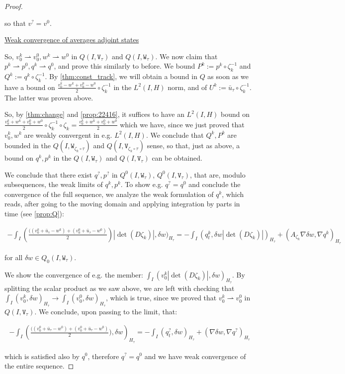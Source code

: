 \documentclass[english,a4paper,9pt,oneside]{scrbook}	%
\theoremstyle{break}
\newenvironment{mproof}[1][\proofname]{%
  \begin{proof}[#1]$ $\par\nobreak\ignorespaces
}{%
  \end{proof}
}
\renewcommand*{\proofname}{Proof}
\theoremstyle{remark}
\newcommand{\ds}{\displaystyle}
\newcommand{\weakc}{\rightharpoonup}
\newcommand{\tw}[1]{\texttt{#1}}
\begin{document}
\begin{mproof}
so that $v^?=v^0$.

\underline{Weak convergence of averages adjoint states}

So, $v_0^k \weakc v_0^0, w^k\weakc w^0$ in $Q(I,\tw{V}_\tau)$ and $Q(I,\tw{W}_\tau)$.
We now claim that $p^k \weakc p^0, q^k\weakc q^0$, and prove this similarly to before. We bound $P^k:=p^k\circ \zeta_k^{-1}$ and $Q^k:=q^k\circ \zeta_k^{-1}$.
By \cref{thm:const_track}, we will obtain a bound in $Q$  as soon as we have a bound on $\ds \frac{v_0^k-w^k+v_0^0-w^0}{2}\circ \zeta_k^{-1}$ in the $L^2(I,H)$ norm, and of $U^k:=\bar{u}_\tau\circ \zeta_k^{-1}$. The latter was proven above.

So, by \cref{thm:change} and \cref{prop:22416}, it suffices to have an $L^2(I,H)$ bound on $\ds \frac{v_0^k+w^k+v_0^0+w^0}{2}\circ \zeta_k^{-1}\circ \zeta_k = \frac{v_0^k+w^k+v_0^0+w^0}{2}$ which we have, since we just proved that $v_0^k, w^k$ are weakly convergent in e.g. $L^2(I,H)$.
We conclude that $Q^k,P^k$ are bounded in the $Q(I,\tw{W}_{\zeta_k\circ \tau})$ and $Q(I,\tw{V}_{\zeta_k\circ \tau})$ sense, so that, just as above,  a bound on $q^k, p^k$ in the $Q(I,\tw{W}_{ \tau})$ and $Q(I,\tw{V}_{ \tau})$ can be obtained.

We conclude that there exist $q^?, p^?$ in $Q^0(I,\tw{W}_{ \tau})$, $Q^0(I,\tw{V}_{ \tau})$, that are, modulo subsequences, the weak limits of $q^k, p^k$.
To show e.g. $q^?=q^0$ and conclude the convergence of the full sequence, we analyze the weak formulation of $q^k$, which reads, after going to the moving domain and applying integration by parts in time (see \cref{prop:Q}):

\begin{align*}
-\int_I \left (\frac{((v_0^k+\bar{u}_\tau - w^k)+(v_0^0+\bar{u}_\tau - w^0)}{2}\right )|\det(D\zeta_k)|,\delta w)_{H_\tau}=
-\int_I (  q^k_t ,   \delta w |\det(D\zeta_k)|)_{H_\tau}+ (A_{\zeta_k}\nabla \delta w, \nabla q^k)_{H_\tau}
\end{align*}

for all $\delta w \in Q_0(I,\tw{W}_{ \tau})$.

We show the convergence of e.g. the member: $\int_I( v_0^k|\det(D\zeta_k)|,\delta w)_{H_\tau}$. By splitting the scalar product as we saw above, we are left with checking that $\int_I (v_0^k,\delta w)_{H_\tau}\rightarrow  \int_I (v_0^0,\delta w)_{H_\tau}$, which is true, since we proved that $v_0^k \weakc v_0^0$ in $Q(I,\tw{V}_\tau)$. We conclude, upon passing to the limit, that:

\begin{align*}
-\int_I \left (\frac{((v_0^0+\bar{u}_\tau - w^0)+(v_0^0+\bar{u}_\tau - w^0)}{2} ),\delta w\right)_{H_\tau} = 
-\int_I (  q^?_t ,   \delta w )_{H_\tau}+ (\nabla \delta w, \nabla q^?)_{H_\tau}
\end{align*}

which is satisfied also by $q^0$, therefore $q^? = q^0$ and we have weak convergence of the entire sequence.
\end{mproof}
\end{document}
